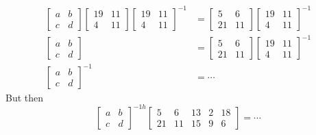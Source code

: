 \documentclass[11pt]{article}
\theoremstyle{definition}\newtheorem{definition}{Definition}
\theoremstyle{definition}\newtheorem{example}{Example}
\theoremstyle{definition}\newtheorem{samplecode}{Sample Code}
\begin{document}
\begin{align*}
    \begin{bmatrix}
        a & b \\ c & d
    \end{bmatrix}\begin{bmatrix}
        19 & 11 \\ 4 & 11
    \end{bmatrix}\begin{bmatrix}
        19 & 11 \\ 4 & 11
    \end{bmatrix}^{-1} &= \begin{bmatrix} 
        5 & 6 \\ 21 & 11
    \end{bmatrix} \begin{bmatrix}
        19 & 11 \\ 4 & 11
    \end{bmatrix}^{-1} \\
    \begin{bmatrix}
        a & b \\ c & d \end{bmatrix} &= \begin{bmatrix} 
            5 & 6 \\ 21 & 11
        \end{bmatrix} \begin{bmatrix}
            19 & 11 \\ 4 & 11
        \end{bmatrix}^{-1} \\
    \begin{bmatrix}
        a & b \\ c & d 
    \end{bmatrix}^{-1} &= \cdots
\end{align*}
But then
\begin{equation*}
    \begin{bmatrix}
        a & b \\ c & d 
    \end{bmatrix}^{-1h}\begin{bmatrix} 5 & 6 & 13 & 2 & 18 \\ 21 & 11 & 15 & 9 & 6 \end{bmatrix} = \cdots
\end{equation*}
\end{document}
